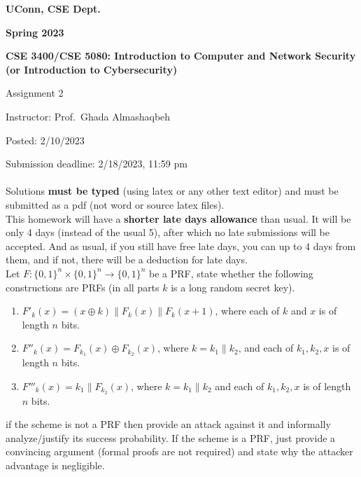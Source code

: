 \documentclass[12pt]{article}
\newcommand{\zo}{\{0,1\}}
\newcommand*\concat{\mathbin{\|}}
\newcommand\xor{\oplus}
\newcommand{\handout}[2]{
\renewcommand{\thepage}{\footnotesize CSE 3400/CSE 5850, #1, p. \arabic{page}}
\begin{center}

\noindent
{\bf UConn, CSE Dept.}

\noindent
{\bf Spring 2023}

\noindent
{\bf CSE 3400/CSE 5080: Introduction to Computer and Network Security \\(or Introduction to Cybersecurity)}
\end{center}

\begin{center}
{\Large #1}
\end{center}
}
\begin{document}
\handout{Assignment 2}{}

\noindent
{Instructor: Prof.~Ghada Almashaqbeh}

\noindent
{Posted: 2/10/2023}

\noindent
{Submission deadline: 2/18/2023, 11:59 pm} \\\\

 Solutions {\bf must be typed} (using latex or any other text editor) and must be submitted as a pdf (not word or source latex files).\\
 This homework will have a \textbf{shorter late days allowance} than usual. It will be only 4 days (instead of the usual 5), after which no late submissions will be accepted. And as usual, if you still have free late days, you can up to 4 days from them, and if not, there will be a deduction for late days.\\

Let $F:\zo^n \times \zo^n \to \zo^n$ be a PRF, state whether the following constructions are PRFs (in all parts $k$ is a long random secret key).

\begin{enumerate}
\item $F'_k(x) = (x \oplus k) \concat F_k(x) \concat F_k(x + 1)$, where each of $k$ and $x$ is of length $n$ bits.

\item $F''_k(x) = F_{k_1}(x) \xor F_{k_2}(x)$, where $k = k_1 \concat k_2$, and each of $k_1, k_2, x$ is of length $n$ bits.

\item $F'''_k(x) = k_1 \concat F_{k_2}(x)$, where $k = k_1 \concat k_2$ and each of $k_1, k_2, x$ is of length $n$ bits.
\end{enumerate}

 if the scheme is not a PRF then provide an attack against it and informally analyze/justify its success probability. If the scheme is a PRF, just provide a convincing argument (formal proofs are not required) and state why the attacker advantage is negligible. \\

\end{document}
